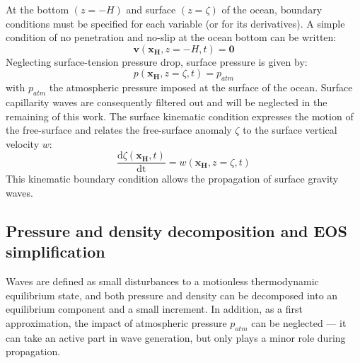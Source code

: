 \documentclass[a4paper,11pt]{article}
\begin{document}
At the bottom $(z=-H)$ and surface $(z=\zeta)$ of the ocean, boundary conditions must be specified for each variable (or for its derivatives). A simple condition of no penetration and no-slip at the ocean bottom can be written:
%
\begin{equation}
 \displaystyle
 \label{NS_BC0}
  \mathbf{v}(\mathbf{x_{\scriptscriptstyle H}},z=-H,t)=\mathbf{0}
\end{equation}
%
Neglecting surface-tension pressure drop, surface pressure is given by:
%
\begin{equation}
 \displaystyle
 \label{NS_BC1}
  p(\mathbf{x_{\scriptscriptstyle H}},z=\zeta,t)= p_{atm}
\end{equation}
%
with $p_{atm}$ the atmospheric pressure imposed at the surface of the ocean. Surface capillarity waves are consequently filtered out and will be neglected in the remaining of this work. The surface kinematic condition expresses the motion of the free-surface and relates the free-surface anomaly $\zeta$ to the surface vertical velocity $w$:
%
\begin{equation}
  \displaystyle
  \label{NS_BC2}
  \frac{\textrm{d}\zeta(\mathbf{x_{\scriptscriptstyle H}},t)}{\textrm{dt}}=w(\mathbf{x_{\scriptscriptstyle H}},z=\zeta,t)
\end{equation}
%
This kinematic boundary condition allows the propagation of surface gravity waves.

\subsection{Pressure and density decomposition and EOS simplification}
\label{SubSectionPRHO}

Waves are defined as small disturbances to a motionless thermodynamic equilibrium state, and both pressure and density can be decomposed into an equilibrium component and a small increment. In addition, as a first approximation, the impact of atmospheric pressure $p_{atm}$ can be neglected --- it can take an active part in wave generation, but only plays a minor role during propagation. 
\end{document}
